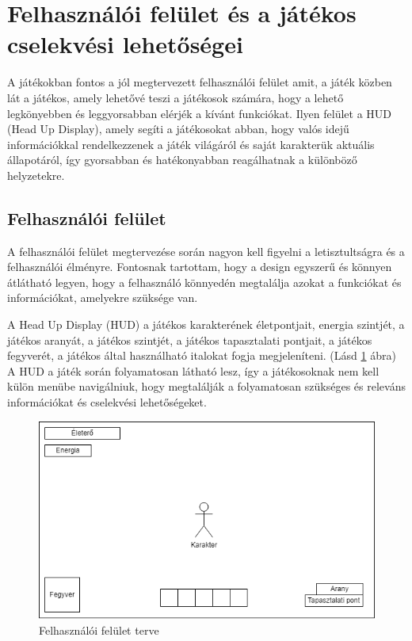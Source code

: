 \section{Felhasználói felület és a játékos cselekvési lehetőségei}

 A játékokban fontos a jól megtervezett felhasználói felület amit, a játék közben lát a játékos, amely lehetővé teszi a játékosok számára, hogy a lehető legkönyebben és leggyorsabban elérjék a kívánt funkciókat. Ilyen felület a HUD (Head Up Display), amely segíti a játékosokat abban, hogy valós idejű információkkal rendelkezzenek a játék világáról és saját karakterük aktuális állapotáról, így gyorsabban és hatékonyabban reagálhatnak a különböző helyzetekre.


\subsection{Felhasználói felület}

 A felhasználói felület megtervezése során nagyon kell figyelni a letisztultságra és a felhasználói élményre. Fontosnak tartottam, hogy a design egyszerű és könnyen átlátható legyen, hogy a felhasználó könnyedén megtalálja azokat a funkciókat és információkat, amelyekre szüksége van.

A Head Up Display (HUD) a játékos karakterének életpontjait, energia szintjét, a játékos aranyát, a játékos szintjét, a játékos tapasztalati pontjait, a játékos fegyverét, a játékos által használható italokat fogja megjeleníteni. (Lásd \ref{fig:Felhasználói felület} ábra)
A HUD a játék során folyamatosan látható lesz, így a játékosoknak nem kell külön menübe navigálniuk, hogy megtalálják a folyamatosan szükséges és releváns információkat és cselekvési lehetőségeket. 

\begin{figure}[H]
    \centering
    \includegraphics[width=14.0truecm]{images/MS_UI.drawio.png}
    \caption{Felhasználói felület terve}
    \label{fig:Felhasználói felület}
\end{figure}

